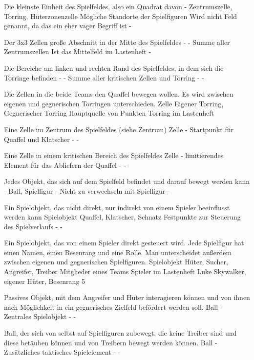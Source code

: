 {Die kleinste Einheit des Spielfeldes, also ein Quadrat davon}
{-}
{Zentrumszelle, Torring, Hüterzonenzelle}
{Mögliche Standorte der Spielfiguren}
{Wird nicht Feld genannt, da das ein eher vager Begriff ist}
{-}

{Der 3x3 Zellen große Abschnitt in der Mitte des Spielfeldes}
{-}
{-}
{Summe aller Zentrumszellen}
{Ist das Mittelfeld im Lastenheft}
{-}

{Die Bereiche am linken und rechten Rand des Spielfeldes, in dem sich die Torringe befinden}
{-}
{-}
{Summe aller kritischen Zellen und Torring}
{-}
{-}

{Die Zellen in die beide Teams den Quaffel bewegen wollen. Es wird zwischen eigenen und gegnerischen Torringen unterschieden.}
{Zelle}
{Eigener Torring, Gegnerischer Torring}
{Hauptquelle von Punkten}
{Torring im Lastenheft}
{}

{Eine Zelle im Zentrum des Spielfeldes (siehe Zentrum)}
{Zelle}
{-}
{Startpunkt für Quaffel und Klatscher}
{-}
{-}

{Eine Zelle in einem kritischen Bereich des Spielfeldes}
{Zelle}
{-}
{limitierendes Element für das Abliefern der Quaffel}
{-}
{-}

{Jedes Objekt, das sich auf dem Spielfeld befindet und darauf bewegt werden kann}
{-}
{Ball, Spielfigur}
{-}
{Nicht zu verwechseln mit Spielfigur}
{-}

{Ein Spielobjekt, das nicht direkt, nur indirekt von einem Spieler beeinflusst werden kann}
{Spielobjekt}
{Quaffel, Klatscher, Schnatz}
{Festpunkte zur Steuerung des Spielverlaufs}
{-}
{-}

{Ein Spielobjekt, das von einem Spieler direkt gesteuert wird. Jede Spielfigur hat einen Namen, einen Besenrang und eine Rolle. Man unterscheidet außerdem zwischen eigenen und gegnerischen Spielfiguren.}
{Spielobjekt}
{Hüter, Sucher, Angreifer, Treiber}
{Mitglieder eines Teams}
{Spieler im Lastenheft}
{Luke Skywalker, eigener Hüter, Besenrang 5}

{Passives Objekt, mit dem Angreifer und Hüter interagieren können und von ihnen nach Möglichkeit in ein gegnerisches Zielfeld befördert werden soll.}
{Ball}
{-}
{Zentrales Spielobjekt}
{-}
{-}

{Ball, der sich von selbst auf Spielfiguren zubewegt, die keine Treiber sind und diese betäuben können und von Treibern bewegt werden können.}
{Ball}
{-}
{Zusätzliches taktisches Spielelement}
{-}
{-}

